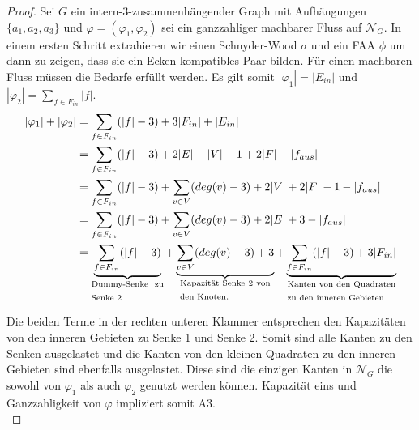 \begin{proof}
Sei $G$ ein intern-3-zusammenhängender Graph mit Aufhängungen $\{a_1,a_2,a_3\}$ und $\varphi=(\varphi_1,\varphi_2)$ sei ein ganzzahliger machbarer Fluss auf $\mathcal{N}_G$. In einem ersten Schritt extrahieren wir einen Schnyder-Wood $\sigma$ und ein FAA $\phi$ um dann zu zeigen, dass sie ein Ecken kompatibles Paar bilden. Für einen machbaren Fluss müssen die Bedarfe erfüllt werden. Es gilt somit $|\varphi_1| =  |E_{in}|$ und $|\varphi_2| = \sum_{f \in F_{in}} |f|$.
\begin{equation}\label{eq_sat}
\begin{split}
|\varphi_1| + |\varphi_2| & = \sum_{f \in F_{in}} (|f|-3) + 3|F_{in}| + |E_{in}|\\
		& = \sum_{f \in F_{in}} (|f|-3) + 2|E| -|V| - 1 + 2|F| - |f_{aus}|\\
		& = \sum_{f \in F_{in}} (|f|-3) + \sum_{v \in V} (deg(v)-3) + 2|V| + 2|F| - 1 - |f_{aus}|\\
		& = \sum_{f \in F_{in}} (|f|-3) + \sum_{v \in V} (deg(v)-3) + 2|E| + 3 - |f_{aus}|\\
		& = \underbrace{\sum_{f \in F_{in}}(|f|-3)  }_{\text{\parbox{8em}{Dummy-Senke zu Senke 2}}} + \underbrace{\sum_{v \in V} (deg(v)-3) +3 }_{\text{\parbox{10em}{Kapazität Senke 2 von den Knoten.}}} +\underbrace{\sum_{f \in F_{in}}(|f|-3) + 3|F_{in}|}_{\text{\parbox{12em}{Kanten von den Quadraten zu den inneren Gebieten}}}
\end{split}
\end{equation}

Die beiden Terme in der rechten unteren Klammer entsprechen den Kapazitäten von den inneren Gebieten zu Senke 1 und Senke 2. Somit sind alle Kanten zu den Senken ausgelastet und die Kanten von den kleinen Quadraten zu den inneren Gebieten sind ebenfalls ausgelastet. Diese sind die einzigen Kanten in $\mathcal{N}_G$ die sowohl von $\varphi_1$ als auch $\varphi_2$ genutzt werden können. Kapazität eins und Ganzzahligkeit von $\varphi$ impliziert somit A3.\\


\end{proof}
